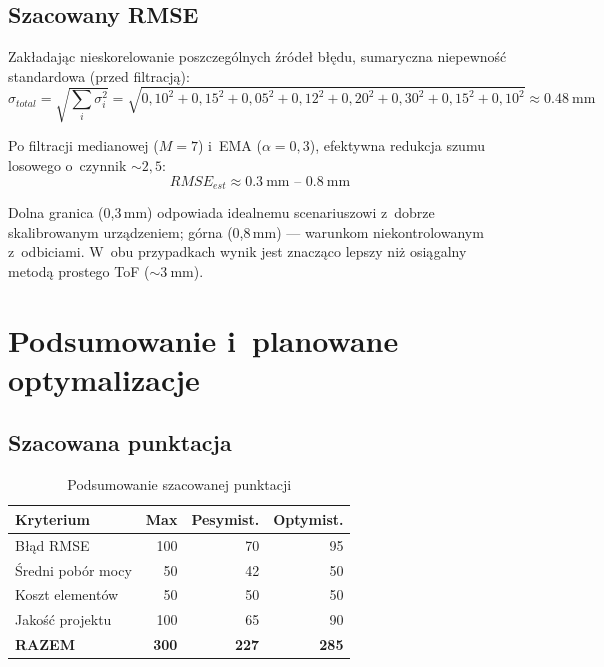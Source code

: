 \documentclass[a4paper,11pt]{article}
\begin{document}
\subsection{Szacowany RMSE}

Zakładając nieskorelowanie poszczególnych źródeł błędu, sumaryczna
niepewność standardowa (przed filtracją):
\begin{equation}
    \sigma_{total} = \sqrt{\sum_i \sigma_i^2}
    = \sqrt{0{,}10^2 + 0{,}15^2 + 0{,}05^2 + 0{,}12^2 + 0{,}20^2 + 0{,}30^2 + 0{,}15^2 + 0{,}10^2}
    \approx \SI{0,48}{\milli\metre}
    \label{eq:sigma_total}
\end{equation}

Po filtracji medianowej ($M = 7$) i~EMA ($\alpha = 0{,}3$), efektywna
redukcja szumu losowego o~czynnik ${\sim}2{,}5$:
\begin{equation}
    \boxed{RMSE_{est} \approx \SI{0,3}{\milli\metre} \text{ -- } \SI{0,8}{\milli\metre}}
    \label{eq:rmse_final}
\end{equation}

Dolna granica (0,3\,mm) odpowiada idealnemu scenariuszowi z~dobrze
skalibrowanym urządzeniem; górna (0,8\,mm) --- warunkom niekontrolowanym
z~odbiciami. W~obu przypadkach wynik jest znacząco lepszy niż osiągalny
metodą prostego ToF (${\sim}\SI{3}{\milli\metre}$).


\section{Podsumowanie i~planowane optymalizacje}
\label{sec:podsumowanie}

\subsection{Szacowana punktacja}

\begin{table}[H]
    \centering
    \caption{Podsumowanie szacowanej punktacji}
    \label{tab:punktacja}
    \begin{tabular}{lrrr}
        \toprule
        \textbf{Kryterium} & \textbf{Max} & \textbf{Pesymist.} & \textbf{Optymist.} \\
        \midrule
        Błąd RMSE         & 100 & 70  & 95 \\
        Średni pobór mocy & 50  & 42  & 50 \\
        Koszt elementów   & 50  & 50  & 50 \\
        Jakość projektu   & 100 & 65  & 90 \\
        \midrule
        \textbf{RAZEM}    & \textbf{300} & \textbf{227} & \textbf{285} \\
        \bottomrule
    \end{tabular}
\end{table}
\end{document}
